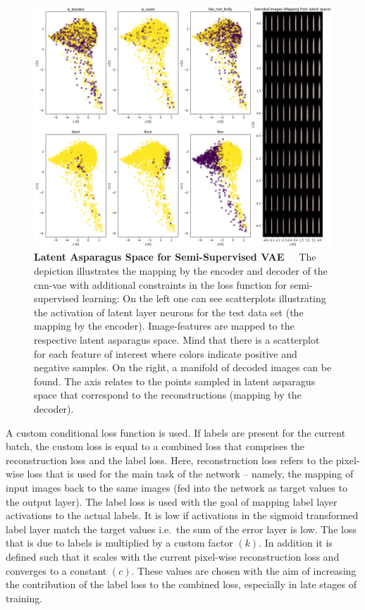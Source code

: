 \begin{figure}[!htb]
	\centering
	\includegraphics[scale=0.35]{Figures/chapter04/semi_supervised_latent_asparagus.png}
	\decoRule
	\caption[Semi-Supervised Convolutional VAE Latent Asparagus Space]{\textbf{Latent Asparagus Space for Semi-Supervised VAE}~~~The depiction illustrates the mapping by the encoder and decoder of the \acrshort{cnn}-\acrshort{vae} with additional constraints in the loss function for semi-supervised learning: On the left one can see scatterplots illustrating the activation of latent layer neurons for the test data set (the mapping by the encoder). Image-features are mapped to the respective latent asparagus space. Mind that there is a scatterplot for each feature of interest where colors indicate positive and negative samples. On the right, a manifold of decoded images can be found. The axis relates to the points sampled in latent asparagus space that correspond to the reconstructions (mapping by the decoder).}
	\label{fig:SemiSupervisedLatentSpace}
\end{figure}

A custom conditional loss function is used. If labels are present for the current batch, the custom loss is equal to a combined loss that comprises the reconstruction loss and the label loss. Here, reconstruction loss refers to the pixel-wise loss that is used for the main task of the network -- namely, the mapping of input images back to the same images (fed into the network as target values to the output layer). The label loss is used with the goal of mapping label layer activations to the actual labels. It is low if activations in the sigmoid transformed label layer match the target values i.e.\ the sum of the error layer is low. The loss that is due to labels is multiplied by a custom factor $(k)$. In addition it is defined such that it scales with the current pixel-wise reconstruction loss and converges to a constant $(c)$. These values are chosen with the aim of increasing the contribution of the label loss to the combined loss, especially in late stages of training.

